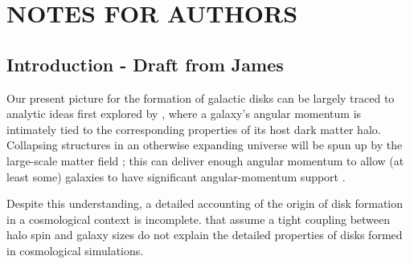 \documentclass[fleqn,usenatbib]{mnras}
\begin{document}


\section{NOTES FOR AUTHORS}

\subsection{Introduction - Draft from James}

Our present picture for the formation of galactic disks can be largely traced to analytic ideas first explored by \citet{fall1980}, where a galaxy's angular momentum is intimately tied to the corresponding properties of its host dark matter halo.  Collapsing structures in an otherwise expanding universe will be spun up by the large-scale matter field \citep{Peebles69};  this can deliver enough angular momentum to allow (at least some) galaxies to have significant angular-momentum support \citep[e.g.][]{MMW98}. 

Despite this understanding, a detailed accounting of the origin of  disk formation in a cosmological context is incomplete. 
that assume a tight coupling between halo spin and galaxy sizes do not explain the detailed properties of disks formed in cosmological simulations\citep[e.g.][]{GK18}.  
\end{document}
